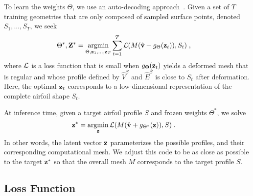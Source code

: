 To learn the weights $\Theta$, we use an auto-decoding approach~\cite{ai.Tan1995,ai.Park2019c}. Given a set of $T$ training geometries that are only composed of sampled surface points, denoted $S_1,\ldots,S_T$, we seek
%
\begin{align}
\Theta^*,\bZ^* &=  \argmin_{\Theta,\bz_1,\ldots,\bz_T} \sum_{t=1}^T \cL(M(\hat{\bv} + g_{\Theta}(\bz_t)) , S_t) \; ,
\label{ch3:eq:autoenc}
\end{align}
%
where $\mathcal{L}$ is a loss function that is small when $g_{\Theta}(\mathbf{z}_t)$ yields a deformed mesh that is regular and whose profile defined by $\hat{V}^S$ and $\hat{E}^S$ is close to $S_t$ after deformation. Here, the optimal $\mathbf{z}_t$ corresponds to a low-dimensional representation of the complete airfoil shape $S_t$.

At inference time, given a target airfoil profile $S$ and frozen weights $\Theta^*$, we solve
%
\begin{align}
\bz^* &=  \argmin_{\bz} \cL(M(\hat{\bv} + g_{\Theta^*}(\bz)) , S) \; .
\label{ch3:eq:autodec}
\end{align}
%
In other words, the latent vector $\mathbf{z}$ parameterizes the possible profiles, and their corresponding computational mesh. We adjust this code to be as close as possible to the target $\mathbf{z}^*$ so that the overall mesh $M$ corresponds to the target profile $S$. 

\subsection{Loss Function}
\label{ch3:sec:loss}

